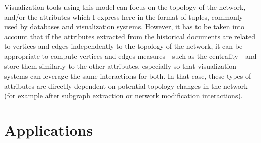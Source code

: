 Visualization tools using this model can focus on the topology of the network, and/or the attributes which I express here in the format of tuples, commonly used by databases and visualization systems\cite{stoltePolarisSystemQuery2002}.
However, it has to be taken into account that if the attributes extracted from the historical documents are related to vertices and edges independently to the topology of the network, it can be appropriate to compute vertices and edges measures---such as the centrality---and store them similarly to the other attributes, especially so that visualization systems can leverage the same interactions for both.
In that case, these types of attributes are directly dependent on potential topology changes in the network (for example after subgraph extraction or network modification interactions).


\section{Applications}\label{sec:hsna-applications}



